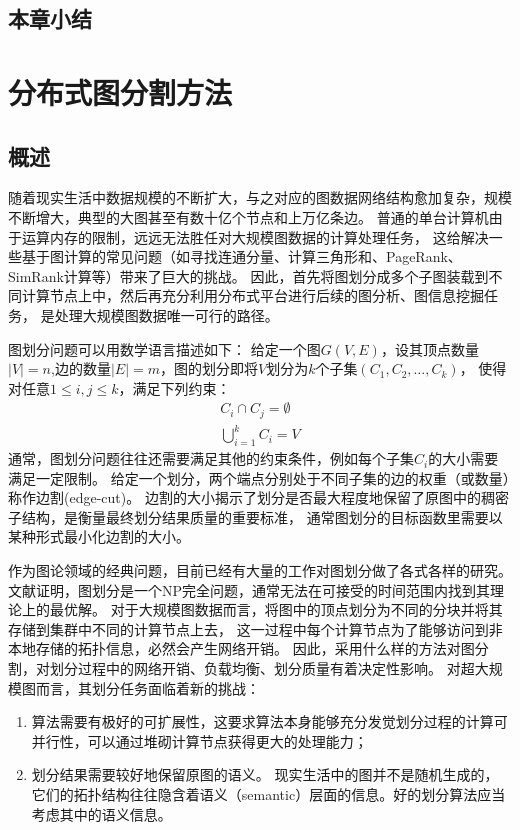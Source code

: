 \documentclass[master]{njuthesis}
\begin{document}
\section{本章小结}
\chapter{分布式图分割方法}\label{chapter_graphpartition}
\section{概述}
随着现实生活中数据规模的不断扩大，与之对应的图数据网络结构愈加复杂，规模不断增大，典型的大图甚至有数十亿个节点和上万亿条边。
普通的单台计算机由于运算内存的限制，远远无法胜任对大规模图数据的计算处理任务，
这给解决一些基于图计算的常见问题（如寻找连通分量\cite{DBLP:conf/sc/HongRO13}、计算三角形和\cite{DBLP:journals/corr/abs-1011-0468}、PageRank\cite{page1999pagerank}、SimRank\cite{jeh2002simrank}计算等）带来了巨大的挑战。
因此，首先将图划分成多个子图装载到不同计算节点上中，然后再充分利用分布式平台进行后续的图分析、图信息挖掘任务，
是处理大规模图数据唯一可行的路径。

图划分问题可以用数学语言描述如下： 给定一个图$G(V, E)$，设其顶点数量$|V|=n$,边的数量$|E|=m$，图的划分即将$V$划分为$k$个子集$(C_1, C_2, \dots, C_k)$，
使得对任意$1 \leq i,j \leq k$，满足下列约束：
\begin{equation}
\begin{aligned}
\label{eq:4-1}
 C_i \cap C_j=\emptyset \\
 \bigcup\limits_{i=1}^{k} C_{i} = V
 \end{aligned}
\end{equation}
通常，图划分问题往往还需要满足其他的约束条件，例如每个子集$C_i$的大小需要满足一定限制。
给定一个划分，两个端点分别处于不同子集的边的权重（或数量）称作边割(edge-cut)。
边割的大小揭示了划分是否最大程度地保留了原图中的稠密子结构，是衡量最终划分结果质量的重要标准，
通常图划分的目标函数里需要以某种形式最小化边割的大小。

作为图论领域的经典问题，目前已经有大量的工作对图划分做了各式各样的研究。 
文献\cite{garey1974somenp}证明，图划分是一个NP完全问题，通常无法在可接受的时间范围内找到其理论上的最优解。
对于大规模图数据而言，将图中的顶点划分为不同的分块并将其存储到集群中不同的计算节点上去，
这一过程中每个计算节点为了能够访问到非本地存储的拓扑信息，必然会产生网络开销。
因此，采用什么样的方法对图分割，对划分过程中的网络开销、负载均衡、划分质量有着决定性影响。
对超大规模图而言，其划分任务面临着新的挑战：
\begin{enumerate}
\item 算法需要有极好的可扩展性，这要求算法本身能够充分发觉划分过程的计算可并行性，可以通过堆砌计算节点获得更大的处理能力；

\item 划分结果需要较好地保留原图的语义。
现实生活中的图并不是随机生成的，它们的拓扑结构往往隐含着语义（semantic）层面的信息。好的划分算法应当考虑其中的语义信息。
\end{enumerate}
\end{document}
